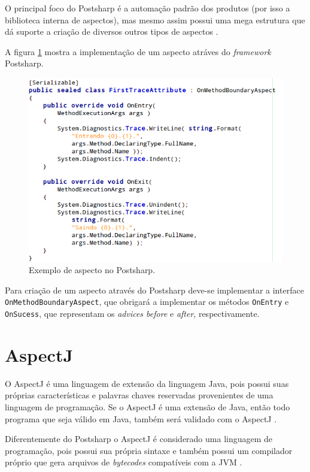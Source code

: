 \documentclass[tc,oneside]{iiufrgs}
\begin{document}
O principal foco do Postsharp é a automação padrão dos produtos (por isso a biblioteca interna de aspectos), mas mesmo assim possui uma mega estrutura que dá suporte a criação de diversos outros tipos de aspectos \cite{groves2013aop}.

A figura \ref{fig:aspectpostsharp} mostra a implementação de um aspecto atráves do \textit{framework} Postsharp.

\begin{figure}[ht]
	\centering
	\includegraphics[scale=0.5]{figuras/ferramentas/aspectpostsharp.png}
	\caption{Exemplo de aspecto no Postsharp.}
	\label{fig:aspectpostsharp}
\end{figure}

Para criação de um aspecto através do Postsharp deve-se implementar a interface \texttt{OnMethodBoundaryAspect}, que obrigará a implementar os métodos \texttt{OnEntry} e \texttt{OnSucess}, que representam os \textit{advices before} e \textit{after}, respectivamente. 

\section{AspectJ}

O AspectJ é uma linguagem de extensão da linguagem Java, pois possui suas próprias características e palavras chaves reservadas provenientes de uma linguagem de programação. Se o AspectJ é uma extensão de Java, então todo programa que seja válido em Java, também será validado com o AspectJ \cite{laddad2003aspectj}.

Diferentemente do Postsharp o AspectJ é considerado uma linguagem de programação, pois possui sua própria sintaxe e também possui um compilador próprio que gera arquivos de \textit{bytecodes} compatíveis com a JVM \cite{laddad2003aspectj}.
\end{document}
